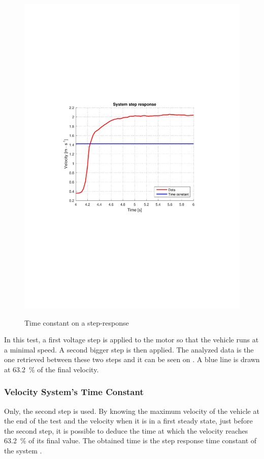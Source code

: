 \begin{figure}[H]
  \centering
  {
    \includegraphics[width=1.0\textwidth]{figures/systemTimeConstant.pdf}
  }
  \caption{Time constant on a step-response}
  \label{fig:systemTimeConstant}
\end{figure}
%
In this test, a first voltage step is applied to the motor so that the vehicle runs at a minimal speed. A second bigger step is then applied. The analyzed data is the one retrieved between these two steps and it can be seen on . A blue line is drawn at \si{\num{63,2} \%} of the final velocity.

\subsubsection{Velocity System's Time Constant}
Only, the second step is used. By knowing the maximum velocity of the vehicle at the end of the test and the velocity when it is in a first steady state, just before the second step, it is possible to deduce the time at which the velocity reaches \si{\num{63,2} \%} of its final value. The obtained time is the step response time constant of the system \si{\tau}.

